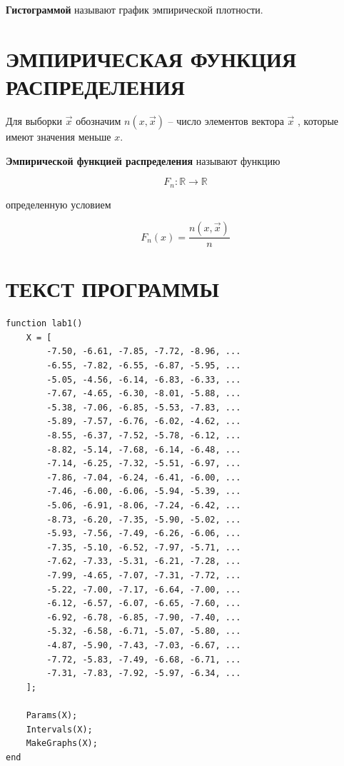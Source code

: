 \textbf{Гистограммой} называют график эмпирической плотности.

\section{ЭМПИРИЧЕСКАЯ ФУНКЦИЯ РАСПРЕДЕЛЕНИЯ}

Для выборки $\vec x$ обозначим $n(x, \vec x)$ -- число элементов вектора
$\vec x$ , которые имеют значения меньше $x$.

\textbf{Эмпирической функцией распределения} называют функцию

\begin{equation*}
    F_n : \mathbb{R} \to \mathbb{R}
\end{equation*}

определенную условием

\begin{equation*}
    F_n(x) = \frac{n(x, \vec x)}{n}
\end{equation*}

\section{ТЕКСТ ПРОГРАММЫ}

\begin{lstlisting}[caption=Точка входа в программу]
function lab1()
    X = [
        -7.50, -6.61, -7.85, -7.72, -8.96, ...
        -6.55, -7.82, -6.55, -6.87, -5.95, ...
        -5.05, -4.56, -6.14, -6.83, -6.33, ...
        -7.67, -4.65, -6.30, -8.01, -5.88, ...
        -5.38, -7.06, -6.85, -5.53, -7.83, ...
        -5.89, -7.57, -6.76, -6.02, -4.62, ...
        -8.55, -6.37, -7.52, -5.78, -6.12, ...
        -8.82, -5.14, -7.68, -6.14, -6.48, ...
        -7.14, -6.25, -7.32, -5.51, -6.97, ...
        -7.86, -7.04, -6.24, -6.41, -6.00, ...
        -7.46, -6.00, -6.06, -5.94, -5.39, ...
        -5.06, -6.91, -8.06, -7.24, -6.42, ...
        -8.73, -6.20, -7.35, -5.90, -5.02, ...
        -5.93, -7.56, -7.49, -6.26, -6.06, ...
        -7.35, -5.10, -6.52, -7.97, -5.71, ...
        -7.62, -7.33, -5.31, -6.21, -7.28, ...
        -7.99, -4.65, -7.07, -7.31, -7.72, ...
        -5.22, -7.00, -7.17, -6.64, -7.00, ...
        -6.12, -6.57, -6.07, -6.65, -7.60, ...
        -6.92, -6.78, -6.85, -7.90, -7.40, ...
        -5.32, -6.58, -6.71, -5.07, -5.80, ...
        -4.87, -5.90, -7.43, -7.03, -6.67, ...
        -7.72, -5.83, -7.49, -6.68, -6.71, ...
        -7.31, -7.83, -7.92, -5.97, -6.34, ...
    ];

    Params(X);
    Intervals(X);
    MakeGraphs(X);
end
\end{lstlisting}

